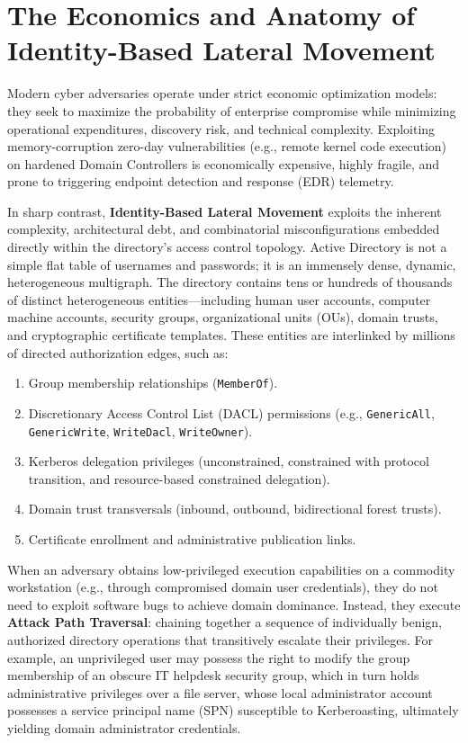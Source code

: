 \section{The Economics and Anatomy of Identity-Based Lateral Movement}
Modern cyber adversaries operate under strict economic optimization models: they seek to maximize the probability of enterprise compromise while minimizing operational expenditures, discovery risk, and technical complexity. Exploiting memory-corruption zero-day vulnerabilities (e.g., remote kernel code execution) on hardened Domain Controllers is economically expensive, highly fragile, and prone to triggering endpoint detection and response (EDR) telemetry. 

In sharp contrast, \textbf{Identity-Based Lateral Movement} exploits the inherent complexity, architectural debt, and combinatorial misconfigurations embedded directly within the directory's access control topology. Active Directory is not a simple flat table of usernames and passwords; it is an immensely dense, dynamic, heterogeneous multigraph. The directory contains tens or hundreds of thousands of distinct heterogeneous entities---including human user accounts, computer machine accounts, security groups, organizational units (OUs), domain trusts, and cryptographic certificate templates. These entities are interlinked by millions of directed authorization edges, such as:
\begin{enumerate}
    \item Group membership relationships (\texttt{MemberOf}).
    \item Discretionary Access Control List (DACL) permissions (e.g., \texttt{GenericAll}, \texttt{GenericWrite}, \texttt{WriteDacl}, \texttt{WriteOwner}).
    \item Kerberos delegation privileges (unconstrained, constrained with protocol transition, and resource-based constrained delegation).
    \item Domain trust transversals (inbound, outbound, bidirectional forest trusts).
    \item Certificate enrollment and administrative publication links.
\end{enumerate}

When an adversary obtains low-privileged execution capabilities on a commodity workstation (e.g., through compromised domain user credentials), they do not need to exploit software bugs to achieve domain dominance. Instead, they execute \textbf{Attack Path Traversal}: chaining together a sequence of individually benign, authorized directory operations that transitively escalate their privileges. For example, an unprivileged user may possess the right to modify the group membership of an obscure IT helpdesk security group, which in turn holds administrative privileges over a file server, whose local administrator account possesses a service principal name (SPN) susceptible to Kerberoasting, ultimately yielding domain administrator credentials.

